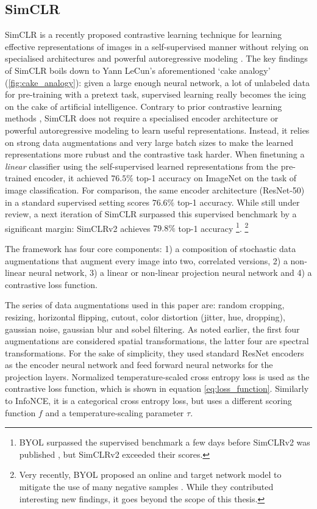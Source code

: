 \subsection{SimCLR}
SimCLR is a recently proposed contrastive learning technique for learning effective representations of images in a self-supervised manner without relying on specialised architectures and powerful autoregressive modeling \cite{chen_simple_2020}.
The key findings of SimCLR boils down to Yann LeCun's aforementioned `cake analogy' (\ref{fig:cake_analogy}): given a large enough neural network, a lot of unlabeled data for pre-training with a pretext task, supervised learning really becomes the icing on the cake of artificial intelligence.
Contrary to prior contrastive learning methods \cite{oord_representation_2019,henaff2019data,hjelm_learning_2019}, SimCLR does not require a specialised encoder architecture or powerful autoregressive modeling to learn useful representations. Instead, it relies on strong data augmentations and very large batch sizes to make the learned representations more rubust and the contrastive task harder.
When finetuning a \textit{linear} classifier using the self-supervised learned representations from the pre-trained encoder, it achieved $76.5\%$ top-1 accuracy on ImageNet on the task of image classification.
For comparison, the same encoder architecture (ResNet-50) in a standard supervised setting scores $76.6\%$ top-1 accuracy.
While still under review, a next iteration of SimCLR surpassed this supervised benchmark by a significant margin: SimCLRv2 achieves $79.8\%$ top-1 accuracy \cite{chen2020big}\footnote{BYOL surpassed the supervised benchmark a few days before SimCLRv2 was published \cite{Grill2020BootstrapYO}, but SimCLRv2 exceeded their scores.}.
\footnote{Very recently, BYOL proposed an online and target network model to mitigate the use of many negative samples \cite{Grill2020BootstrapYO}.
While they contributed interesting new findings, it goes beyond the scope of this thesis.}

The framework has four core components: 1) a composition of stochastic data augmentations that augment every image into two, correlated versions, 2) a non-linear neural network, 3) a linear or non-linear projection neural network and 4) a contrastive loss function.

The series of data augmentations used in this paper are: random cropping, resizing, horizontal flipping, cutout, color distortion (jitter, hue, dropping), gaussian noise, gaussian blur and sobel filtering. As noted earlier, the first four augmentations are considered spatial transformations, the latter four are spectral transformations.
For the sake of simplicity, they used standard ResNet encoders as the encoder neural network and feed forward neural networks for the projection layers.
Normalized temperature-scaled cross entropy loss is used as the contrastive loss function, which is shown in equation \ref{eq:loss_function}. Similarly to InfoNCE, it is a categorical cross entropy loss, but uses a different scoring function $f$ and a temperature-scaling parameter $\tau$.

